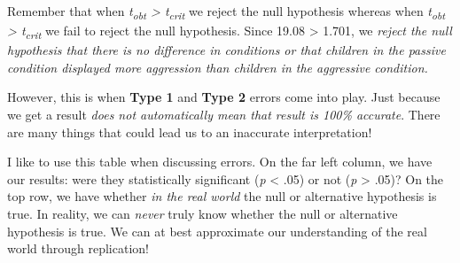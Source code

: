 \documentclass[
]{book}
\begin{document}
Remember that when \emph{t\textsubscript{obt} \textgreater{} t\textsubscript{crit}} we reject the null hypothesis whereas when \emph{t\textsubscript{obt} \textgreater{} t\textsubscript{crit}} we fail to reject the null hypothesis. Since 19.08 \textgreater{} 1.701, we \emph{reject the null hypothesis that there is no difference in conditions or that children in the passive condition displayed more aggression than children in the aggressive condition.}

However, this is when \textbf{Type 1} and \textbf{Type 2} errors come into play. Just because we get a result \emph{does not automatically mean that result is 100\% accurate}. There are many things that could lead us to an inaccurate interpretation!

I like to use this table when discussing errors. On the far left column, we have our results: were they statistically significant (\emph{p} \textless{} .05) or not (\emph{p} \textgreater{} .05)? On the top row, we have whether \emph{in the real world} the null or alternative hypothesis is true. In reality, we can \emph{never} truly know whether the null or alternative hypothesis is true. We can at best approximate our understanding of the real world through replication!
\end{document}
